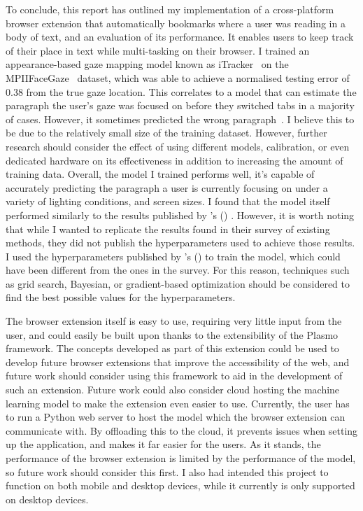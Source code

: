 \documentclass{report}
\newcommand\posscite[1]{\citeauthor{#1}'s (\citeyear{#1}) \cite{#1}}
\begin{document}
To conclude, this report has outlined my implementation of a cross-platform browser extension that automatically bookmarks where a user was reading in a body of text, and an evaluation of its performance. It enables users to keep track of their place in text while multi-tasking on their browser. I trained an appearance-based gaze mapping model known as iTracker~\cite{krafka2016eye} on the MPIIFaceGaze~\cite{zhang2019mpii} dataset, which was able to achieve a normalised testing error of 0.38 from the true gaze location. This correlates to a model that can estimate the paragraph the user's gaze was focused on before they switched tabs in a majority of cases. However, it sometimes predicted the wrong paragraph~\cite{demonstrationVideo}. I believe this to be due to the relatively small size of the training dataset. However, further research should consider the effect of using different models, calibration, or even dedicated hardware on its effectiveness in addition to increasing the amount of training data. Overall, the model I trained performs well, it's capable of accurately predicting the paragraph a user is currently focusing on under a variety of lighting conditions, and screen sizes. I found that the model itself performed similarly to the results published by \posscite{cheng2021survey}. However, it is worth noting that while I wanted to replicate the results found in their survey of existing methods, they did not publish the hyperparameters used to achieve those results. I used the hyperparameters published by \posscite{krafka2016eye} to train the model, which could have been different from the ones in the survey. For this reason, techniques such as grid search, Bayesian, or gradient-based optimization should be considered to find the best possible values for the hyperparameters. 

The browser extension itself is easy to use, requiring very little input from the user, and could easily be built upon thanks to the extensibility of the Plasmo framework. The concepts developed as part of this extension could be used to develop future browser extensions that improve the accessibility of the web, and future work should consider using this framework to aid in the development of such an extension. Future work could also consider cloud hosting the machine learning model to make the extension even easier to use. Currently, the user has to run a Python web server to host the model which the browser extension can communicate with. By offloading this to the cloud, it prevents issues when setting up the application, and makes it far easier for the users. As it stands, the performance of the browser extension is limited by the performance of the model, so future work should consider this first. I also had intended this project to function on both mobile and desktop devices, while it currently is only supported on desktop devices.  
\end{document}
